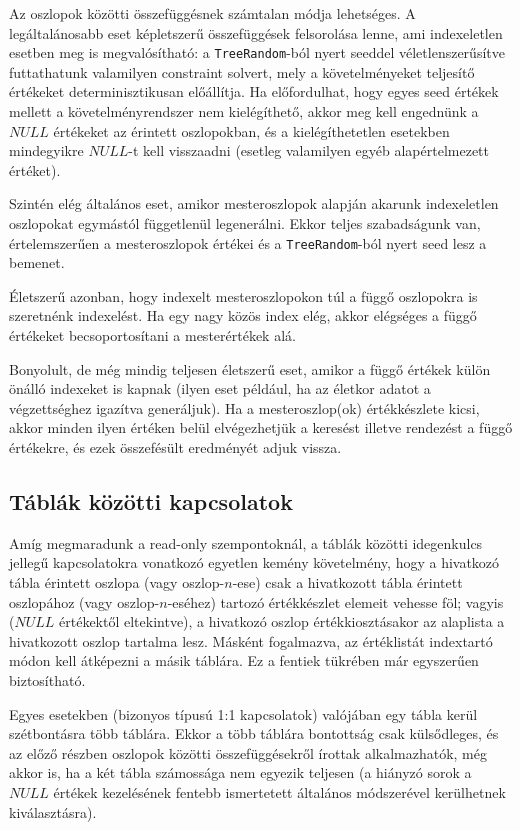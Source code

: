 \documentclass[
    parspace,
    noindent,
    nohyp,
]{elteiktdk}[2023/04/10]
\begin{document}
Az oszlopok közötti összefüggésnek számtalan módja lehetséges.
A legáltalánosabb eset képletszerű összefüggések felsorolása lenne,
ami indexeletlen esetben meg is megvalósítható:
a \texttt{TreeRandom}-ból nyert seeddel véletlenszerűsítve futtathatunk valamilyen constraint solvert,
mely a követelményeket teljesítő értékeket determinisztikusan előállítja.
Ha előfordulhat, hogy egyes seed értékek mellett a követelményrendszer nem kielégíthető,
akkor meg kell engednünk a $NULL$ értékeket az érintett oszlopokban,
és a kielégíthetetlen esetekben mindegyikre $NULL$-t kell visszaadni
(esetleg valamilyen egyéb alapértelmezett értéket).

Szintén elég általános eset, amikor mesteroszlopok
alapján akarunk indexeletlen oszlopokat egymástól függetlenül legenerálni.
Ekkor teljes szabadságunk van,
értelemszerűen a mesteroszlopok értékei és a \texttt{TreeRandom}-ból nyert seed lesz a bemenet.

Életszerű azonban, hogy indexelt mesteroszlopokon túl
a függő oszlopokra is szeretnénk indexelést.
Ha egy nagy közös index elég,
akkor elégséges a függő értékeket becsoportosítani a mesterértékek alá.

Bonyolult, de még mindig teljesen életszerű eset,
amikor a függő értékek külön önálló indexeket is kapnak
(ilyen eset például, ha az életkor adatot a végzettséghez igazítva generáljuk).
Ha a mesteroszlop(ok) értékkészlete kicsi,
akkor minden ilyen értéken belül elvégezhetjük a keresést illetve rendezést a függő értékekre,
és ezek összefésült eredményét adjuk vissza.

\subsection{Táblák közötti kapcsolatok}

Amíg megmaradunk a read-only szempontoknál,
a táblák közötti idegenkulcs jellegű kapcsolatokra vonatkozó egyetlen kemény követelmény,
hogy a hivatkozó tábla érintett oszlopa (vagy oszlop-$n$-ese)
csak a hivatkozott tábla érintett oszlopához (vagy oszlop-$n$-eséhez)
tartozó értékkészlet elemeit vehesse föl;
vagyis ($NULL$ értékektől eltekintve),
a hivatkozó oszlop értékkiosztásakor az alaplista a hivatkozott oszlop tartalma lesz.
Másként fogalmazva, az értéklistát indextartó módon kell átképezni a másik táblára.
Ez a fentiek tükrében már egyszerűen biztosítható.

Egyes esetekben (bizonyos típusú 1:1 kapcsolatok) valójában egy tábla kerül szétbontásra több táblára.
Ekkor a több táblára bontottság csak külsődleges,
és az előző részben oszlopok közötti összefüggésekről írottak alkalmazhatók,
még akkor is, ha a két tábla számossága nem egyezik teljesen
(a hiányzó sorok a $NULL$ értékek kezelésének fentebb ismertetett
általános módszerével kerülhetnek kiválasztásra).
\end{document}
